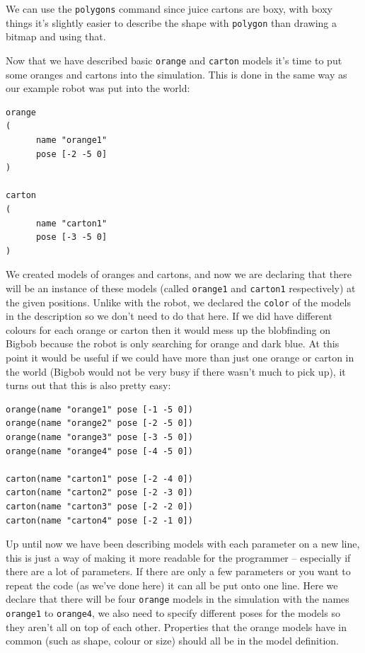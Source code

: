 \documentclass[a4paper]{report}
\begin{document}
We can use the \verb|polygons| command since juice cartons are boxy, with boxy things it's slightly easier to describe the shape with \verb|polygon| than drawing a bitmap and using that.\newline

Now that we have described basic \verb|orange| and \verb|carton| models it's time to put some oranges and cartons into the simulation. This is done in the same way as our example robot was put into the world:
\begin{verbatim}
orange
(
      name "orange1" 
      pose [-2 -5 0]
)

carton
(
      name "carton1" 
      pose [-3 -5 0]
)
\end{verbatim}
We created models of oranges and cartons, and now we are declaring that there will be an instance of these models (called \verb|orange1| and \verb|carton1| respectively) at the given positions. Unlike with the robot, we declared the \verb|color| of the models in the description so we don't need to do that here. If we did have different colours for each orange or carton then it would mess up the blobfinding on Bigbob because the robot is only searching for orange and dark blue.
At this point it would be useful if we could have more than just one orange or carton in the world (Bigbob would not be very busy if there wasn't much to pick up), it turns out that this is also pretty easy:
\begin{verbatim}
orange(name "orange1" pose [-1 -5 0])
orange(name "orange2" pose [-2 -5 0])
orange(name "orange3" pose [-3 -5 0])
orange(name "orange4" pose [-4 -5 0])

carton(name "carton1" pose [-2 -4 0])
carton(name "carton2" pose [-2 -3 0])
carton(name "carton3" pose [-2 -2 0])
carton(name "carton4" pose [-2 -1 0])
\end{verbatim}

Up until now we have been describing models with each parameter on a new line, this is just a way of making it more readable for the programmer -- especially if there are a lot of parameters. If there are only a few parameters or you want to repeat the code (as we've done here) it can all be put onto one line. Here we declare that there will be four \verb|orange| models in the simulation with the names \verb|orange1| to \verb|orange4|, we also need to specify different poses for the models so they aren't all on top of each other. Properties that the orange models have in common (such as shape, colour or size) should all be in the model definition. 
\end{document}
